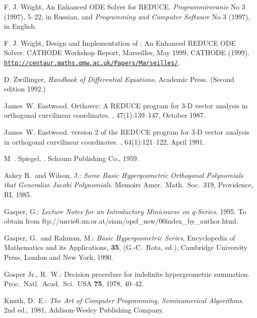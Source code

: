 \begin{thebibliography}{999}
 F. J. Wright, An Enhanced ODE Solver for REDUCE.
\textit{Programmirovanie} No 3 (1997), 5--22, in Russian, and
\textit{Programming and Computer Software} No 3 (1997), in English.

 F. J. Wright, Design and Implementation of
 : An Enhanced REDUCE ODE Solver.  CATHODE Workshop
Report, Marseilles, May 1999, CATHODE (1999). \\
\href{http://centaur.maths.qmw.ac.uk/Papers/Marseilles/}%
{\texttt{http://centaur.maths.qmw.ac.uk/Papers/Marseilles/}}.

 D. Zwillinger, \textit{Handbook of Differential
Equations}, Academic Press.  (Second edition 1992.)


James~W. Eastwood.
\newblock Orthovec: A {REDUCE} program for {3-D} vector analysis in orthogonal
  curvilinear coordinates.
, 47(1):139--147, October 1987.

James~W. Eastwood.
 version 2 of the {REDUCE} program for {3-D} vector
  analysis in orthogonal curvilinear coordinates.
, 64(1):121--122, April 1991.

M~. Spiegel.
.
\newblock Schaum Publishing Co., 1959.


Askey R.\ and Wilson, J.:
{\sl Some Basic Hypergeometric Orthogonal Polynomials that Generalize Jacobi
Polynomials}. Memoirs Amer.\ Math.\ Soc.\ 319, Providence, RI, 1985.

Gasper, G.:
{\sl Lecture Notes for an Introductory Minicourse on $q$-Series}.
1995. To obtain from  
ftp://unvie6.un.or.at/siam/opsf\_new/\linebreak 00index\_by\_author.html.

Gasper, G.\ and Rahman, M.:
{\sl Basic Hypergeometric Series},
Encyclopedia of Mathematics and its Applications, 
\textbf{35}, (G.-C.\ Rota, ed.), Cambridge University Press,
London and New York, 1990.

Gosper Jr., R.\ W.:
Decision procedure for indefinite hypergeometric
summation. Proc.\ Natl.\ Acad.\ Sci.\ USA \textbf{75}, 1978, 40--42.

Knuth, D.\ E.:
{\sl The Art of Computer Programming, Seminumerical Algorithms}.
2nd ed., 1981, Addison-Wesley Publishing Company.


\end{thebibliography}
